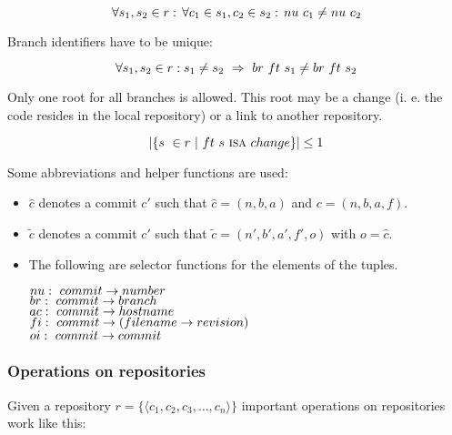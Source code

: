 \documentclass[fleqn, german, 10pt, a4paper]{article}
\begin{document}
\begin{displaymath}
\forall s_1, s_2 \in r:\, \forall c_1 \in s_1, c_2 \in s_2:\, \mathnormal{nu}\ c_1
\neq \mathnormal{nu}\ c_2
\end{displaymath}

Branch identifiers have to be unique:

\begin{displaymath}
\forall s_1, s_2 \in r: s_1 \neq s_2\ \Rightarrow\ \mathnormal{br}\ \mathnormal{ft}\ s_1
\neq \mathnormal{br}\ \mathnormal{ft}\ s_2
\end{displaymath}

Only one root for all branches is allowed. This root may be a change (i. e.
the code resides in the local repository) or a link to another repository.

\begin{displaymath}
|\{ s\ \in r\ |\
 \mathnormal{ft}\ s\ \mbox{\textsc{isa}}\
\mathnormal{change}\}| \le 1
\end{displaymath}

Some abbreviations and helper functions are used:

\begin{itemize}
\item $\hat c$ denotes a commit $c'$ such that $\hat c = (n, b, a)$
and $c=(n, b, a, f)$.
\item $\tilde c$ denotes a commit $c'$ such that $\tilde
c = (n', b', a', f', o)$ with $o = \hat c$.
\item The following are selector functions for the elements of the
tuples.


$\mathnormal{nu}:\ \mathnormal{commit} \rightarrow \mathnormal{number}$ \\
$\mathnormal{br}:\ \mathnormal{commit} \rightarrow \mathnormal{branch}$ \\
$\mathnormal{ac}:\ \mathnormal{commit} \rightarrow \mathnormal{hostname}$ \\
$\mathnormal{fi}:\ \mathnormal{commit} \rightarrow (\mathnormal{filename} \rightarrow \mathnormal{revision})$ \\
$\mathnormal{oi}:\ \mathnormal{commit} \rightarrow \mathnormal{commit}$
\end{itemize}

\subsubsection{Operations on repositories}

Given a repository $r = \{\langle c_1, c_2, c_3, \ldots, c_n\rangle\}$ 
important operations on repositories work like this:
\end{document}
